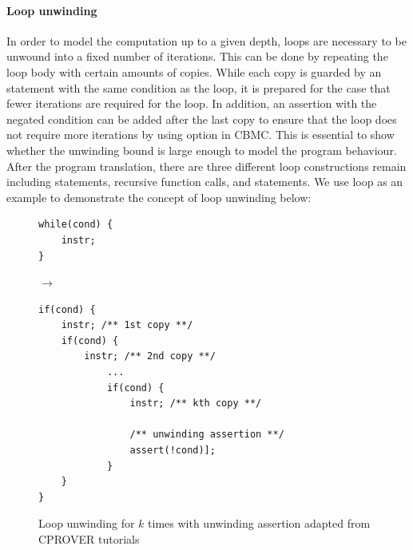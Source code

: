 \paragraph{Loop unwinding} \label{unwinding} In order to model the computation up to a given depth, loops are necessary to be unwound into a fixed number of iterations. This can be done by repeating the loop body with certain amounts of copies. While each copy is guarded by an  statement with the same condition as the loop, it is prepared for the case that fewer iterations are required for the loop. In addition, an assertion with the negated condition can be added after the last copy to ensure that the loop does not require more iterations by using  option in CBMC. This
is essential to show whether the unwinding bound is large enough to model the program behaviour. After the program translation, there are three different loop constructions remain including  statements, recursive function calls, and  statements. We use  loop as an example to demonstrate the concept of loop unwinding below: 


\begin{figure}[H]
\centering
{
\begin{minipage}{.2\textwidth}
\begin{verbatim}
while(cond) {
    instr;
}    
\end{verbatim}
\end{minipage}
\begin{minipage}[]{.05\textwidth}
$\to$
\end{minipage}
\begin{minipage}[]{.5\textwidth}
\begin{verbatim}
if(cond) {
    instr; /** 1st copy **/
    if(cond) {
        instr; /** 2nd copy **/
            ...
            if(cond) {
                instr; /** kth copy **/
                
                /** unwinding assertion **/
                assert(!cond)]; 
            }
    }
}    
\end{verbatim}
\end{minipage}
}
\caption{Loop unwinding for $k$ times with unwinding assertion adapted from CPROVER tutorials \protect\footnotemark}
\end{figure}

